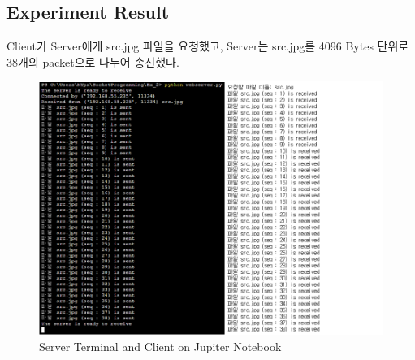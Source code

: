 \subsection{Experiment Result}
Client가 Server에게 src.jpg 파일을 요청했고, Server는 src.jpg를 4096 Bytes 단위로 38개의 packet으로 나누어 송신했다. \\
\vspace{-4mm}
\begin{figure}[!h]\centering 
	\includegraphics[width=.99\textwidth]{image/week09/2-1.png}
	\caption{\footnotesize
	Server Terminal and Client on Jupiter Notebook}
	\vspace{-10pt}
\end{figure}

